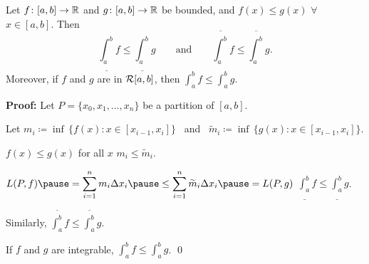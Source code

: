 \documentclass[10pt,aspectratio=149]{beamer}
\begin{document}
\begin{frame}

\begin{proposition}[Monotonicity]
Let $f \colon [a,b] \to {\mathbb{R}}$ and $g \colon [a,b] \to {\mathbb{R}}$ be
bounded, and $f(x) \leq g(x)$
$\forall$ $x \in [a,b]$.
\pause
Then
\begin{equation*}
\underline{\int_a^b} f 
\leq
\underline{\int_a^b} g 
\qquad \text{and} \qquad
\overline{\int_a^b} f 
\leq
\overline{\int_a^b} g .
\end{equation*}
\pause
Moreover, if $f$ and $g$ are in ${\mathcal{R}}[a,b]$, then
$\displaystyle
\int_a^b f 
\leq
\int_a^b g$.
\end{proposition}

\pause
\textbf{Proof:}
Let $P = \{ x_0, x_1, \ldots, x_n \}$ be a partition of $[a,b]$.

\pause
Let
$m_i \coloneqq \inf \, \bigl\{ f(x) : x \in [x_{i-1},x_i] \bigr\}$
~and~
$\widetilde{m}_i \coloneqq \inf \, \bigl\{ g(x) : x \in [x_{i-1},x_i]
\bigr\}$.

\pause
$f(x) \leq g(x)$ for all $x$ \wthus $m_i \leq \widetilde{m}_i$.

\pause
\medskip

$\displaystyle
L(P,f)
\pause
=
\sum_{i=1}^n m_i \Delta x_i
\pause
\leq
\sum_{i=1}^n \widetilde{m}_i \Delta x_i
\pause
=
L(P,g)$
\pause
\wwthus
$\underline{\int_a^b} f 
\leq
\underline{\int_a^b} g$.

\pause
\medskip

Similarly,
$\overline{\int_a^b} f 
\leq
\overline{\int_a^b} g$.

\pause
\medskip

If $f$ and $g$ are integrable, \wthus
$\int_a^b f 
\leq
\int_a^b g$.
\qed

\end{frame}
\end{document}
